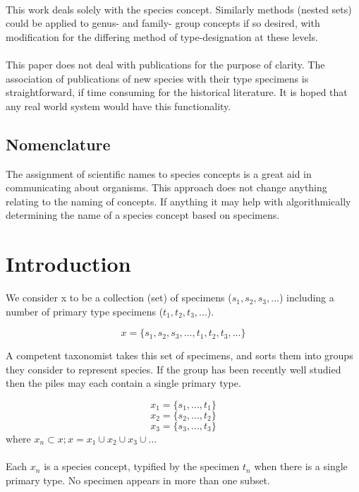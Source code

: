 \documentclass{article}
\begin{document}
   \paragraph{}
   This work deals solely with the species concept. Similarly methods (nested sets) could be applied to genus- and family- group concepts if so desired, with modification for the differing method of type-designation at these levels.
   \paragraph{}
   This paper does not deal with publications for the purpose of clarity. The association of publications of new species with their type specimens is straightforward, if time consuming for the historical literature. It is hoped that any real world system would have this functionality.
   \subsection{Nomenclature}
   The assignment of scientific names to species concepts is a great aid in communicating about organisms. This approach does not change anything relating to the naming of concepts. If anything it may help with algorithmically determining the name of a species concept based on specimens.
   \section{Introduction}
   We consider x to be a collection (set) of specimens ($s_1, s_2, s_3, ...$) including a number of primary type specimens ($t_1, t_2, t_3, ...$).
   
   \[x = \{s_1, s_2, s_3, ..., t_1, t_2, t_3, ...\}\]
   
   A competent taxonomist takes this set of specimens, and sorts them into groups they consider to represent species. If the group has been recently well studied then the piles may each contain a single primary type.

   \[x_1 = \{s_1, ..., t_1\}\]
   \[x_2 = \{s_2, ..., t_2\}\]
   \[x_3 = \{s_3, ..., t_3\}\]
   where $x_n \subset x; x= x_1 \cup x_2 \cup x_3 \cup ...$
   
   \paragraph{}
   Each $x_n$ is a species concept, typified by the specimen $t_n$ when there is a single primary type. No specimen appears in more than one subset.
   
\end{document}
